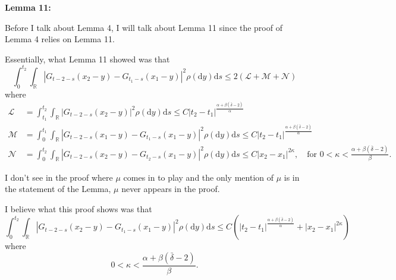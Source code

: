 \documentclass[a4paper,11pt]{article}
\numberwithin{equation}{section}
\numberwithin{equation}{section}
\theoremstyle{plain}
\theoremstyle{definition}
\newcommand{\ud}{\ensuremath{\mathrm{d} }}
\newcommand{\R}{\mathbb{R}}
\begin{document}
\textbf{Lemma 11:}

Before I talk about Lemma 4, I will talk about Lemma 11 since the proof of Lemma 4 relies on Lemma 11.

Essentially, what Lemma 11 showed was that
	\[
		\int_0^{t_2}\int_{\R} |G_{t-2-s}(x_2-y) - G_{t_1-s}(x_1-y)|^2 \rho(\ud y) \ud s \le 2(\mathcal{L} + \mathcal{M} + \mathcal{N})
	\]
where 
	\begin{align*}
		\mathcal{L} &=	\int_{t_1}^{t_2}\int_{\R} |G_{t-2-s}(x_2-y)|^2 \rho(\ud y) \ud s \le C|t_2-t_1|^{\frac{\alpha+\beta(\bar{\delta}-2)}{\alpha}}
	\\	\mathcal{M} &= 	\int_0^{t_1}\int_{\R} |G_{t-2-s}(x_1-y) - G_{t_1-s}(x_1-y)|^2 \rho(\ud y) \ud s \le C|t_2-t_1|^{\frac{\alpha+\beta(\bar{\delta}-2)}{\alpha}}
	\\ \mathcal{N} &= 	\int_0^{t_2}\int_{\R} |G_{t-2-s}(x_2-y) - G_{t_2-s}(x_1-y)|^2 \rho(\ud y) \ud s \le C |x_2-x_1|^{2\kappa}, \quad \text{for }0 < \kappa < \frac{\alpha+\beta(\bar{\delta}-2)}{\beta}.
	\end{align*}

I don't see in the proof where $\mu$ comes in to play and the only mention of $\mu$ is in the statement of the Lemma, $\mu$ never appears in the proof. 

I believe what this proof shows was that 
	\[
			\int_0^{t_2}\int_{\R} |G_{t-2-s}(x_2-y) - G_{t_1-s}(x_1-y)|^2 \rho(\ud y) \ud s \le C \left( |t_2-t_1|^{\frac{\alpha+\beta(\bar{\delta}-2)}{\alpha}} + |x_2-x_1|^{2\kappa} \right)
	\]
where 
	\[
		0 < \kappa < \frac{\alpha+\beta(\bar{\delta}-2)}{\beta}.
	\]
\end{document}
